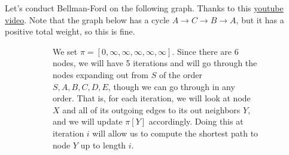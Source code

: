   \begin{example}
    \label{ex:bellman-ford-walkthrough}
    Let's conduct Bellman-Ford on the following graph. Thanks to this \href{https://www.youtube.com/watch?v=obWXjtg0L64&ab_channel=MichaelSambol}{youtube video}. Note that the graph below has a cycle $A \rightarrow C \rightarrow B \rightarrow A$, but it has a positive total weight, so this is fine. 

    \begin{figure}[H]
      \centering
      \begin{subfigure}[b]{0.48\textwidth}
        \centering
        \caption{We set $\pi = [0, \infty, \infty, \infty, \infty, \infty]$. Since there are 6 nodes, we will have 5 iterations and will go through the nodes expanding out from $S$ of the order $S, A, B, C, D, E$, though we can go through in any order. That is, for each iteration, we will look at node $X$ and all of its outgoing edges to its out neighbors $Y$, and we will update $\pi[Y]$ accordingly. Doing this at iteration $i$ will allow us to compute the shortest path to node $Y$ up to length $i$. }
      \end{subfigure}
      \hfill 
      \begin{subfigure}[b]{0.48\textwidth}
        \centering
\end{subfigure}
\end{figure}
\end{example}
